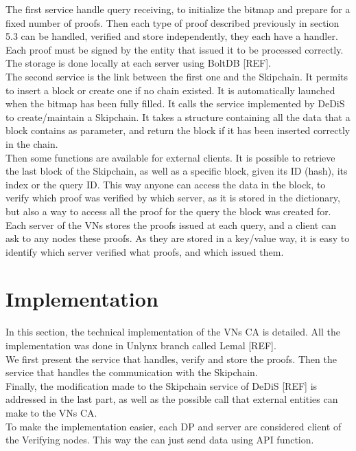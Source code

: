 \documentclass{article}
\begin{document}
The first service handle query receiving, to initialize the bitmap and prepare for a fixed number of proofs. Then each type of proof described previously in section 5.3 can be handled, verified and store independently, they each have a handler. Each proof must be signed by the entity that issued it to be processed correctly. The storage is done locally at each server using BoltDB [REF].\\

The second service is the link between the first one and the Skipchain. It permits to insert a block or create one if no chain existed. It is automatically launched when the bitmap has been fully filled. It calls the service implemented by DeDiS to create/maintain a Skipchain. It takes a structure containing all the data that a block contains as parameter, and return the block if it has been inserted correctly in the chain.\\

Then some functions are available for external clients. It is possible to retrieve the last block of the Skipchain, as well as a specific block, given its ID (hash), its index or the query ID. This way anyone can access the data in the block, to verify which proof was verified by which server, as it is stored in the dictionary, but also a way to access all the proof for the query the block was created for.\\
Each server of the VNs stores the proofs issued at each query, and a client can ask to any nodes these proofs. As they are stored in a key/value way, it is easy to identify which server verified what proofs, and which issued them.

\section{Implementation}
In this section, the technical implementation of the VNs CA is detailed. All the implementation was done in Unlynx branch called Lemal [REF].\\
We first present the service that handles, verify and store the proofs. Then the service that handles the communication with the Skipchain.\\
Finally, the modification made to the Skipchain service of DeDiS [REF] is addressed in the last part, as well as the possible call that external entities can make to the VNs CA.\\

To make the implementation easier, each DP and server are considered client of the Verifying nodes. This way the can just send data using API function.\\
\end{document}
